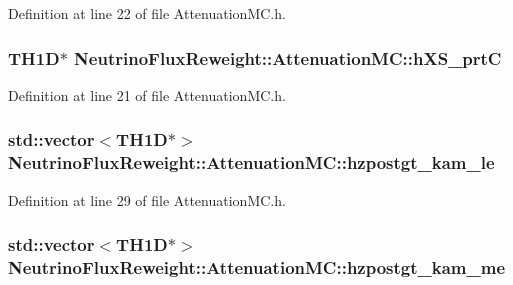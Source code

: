 Definition at line 22 of file Attenuation\-M\-C.\-h.

\hypertarget{class_neutrino_flux_reweight_1_1_attenuation_m_c_a6a8883254ecc6e301643493923c3cde0}{
\subsubsection[{h\-X\-S\-\_\-prt\-C}]{\setlength{\rightskip}{0pt plus 5cm}T\-H1\-D$\ast$ Neutrino\-Flux\-Reweight\-::\-Attenuation\-M\-C\-::h\-X\-S\-\_\-prt\-C}}\label{class_neutrino_flux_reweight_1_1_attenuation_m_c_a6a8883254ecc6e301643493923c3cde0}


Definition at line 21 of file Attenuation\-M\-C.\-h.

\hypertarget{class_neutrino_flux_reweight_1_1_attenuation_m_c_af7f31787553e49e1803626c24e722277}{
\subsubsection[{hzpostgt\-\_\-kam\-\_\-le}]{\setlength{\rightskip}{0pt plus 5cm}std\-::vector$<$T\-H1\-D$\ast$$>$ Neutrino\-Flux\-Reweight\-::\-Attenuation\-M\-C\-::hzpostgt\-\_\-kam\-\_\-le}}\label{class_neutrino_flux_reweight_1_1_attenuation_m_c_af7f31787553e49e1803626c24e722277}


Definition at line 29 of file Attenuation\-M\-C.\-h.

\hypertarget{class_neutrino_flux_reweight_1_1_attenuation_m_c_ace0dd74d05ab00993b319e53087f2ce2}{
\subsubsection[{hzpostgt\-\_\-kam\-\_\-me}]{\setlength{\rightskip}{0pt plus 5cm}std\-::vector$<$T\-H1\-D$\ast$$>$ Neutrino\-Flux\-Reweight\-::\-Attenuation\-M\-C\-::hzpostgt\-\_\-kam\-\_\-me}}\label{class_neutrino_flux_reweight_1_1_attenuation_m_c_ace0dd74d05ab00993b319e53087f2ce2}


